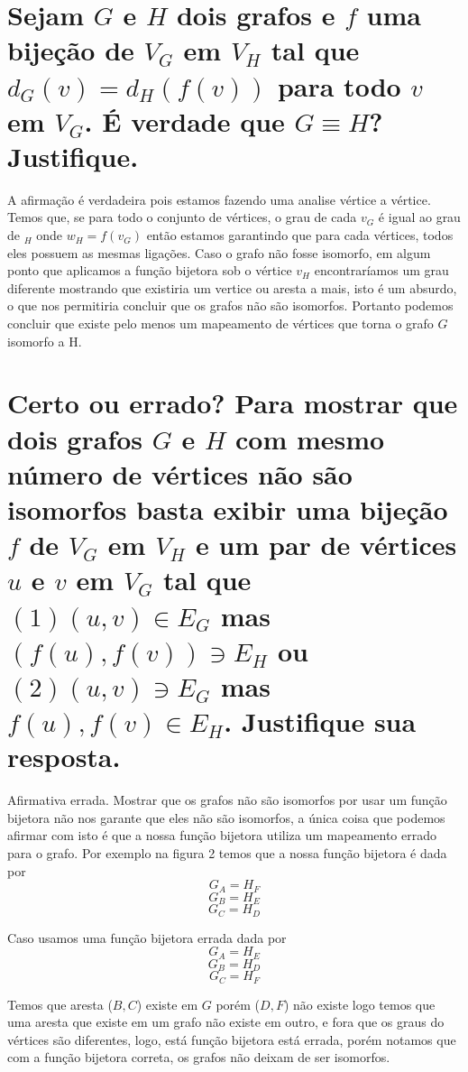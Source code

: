 \documentclass[a4paper,12pt]{article}
\begin{document}
\section{Sejam $G$ e $H$ dois grafos e $f$ uma bijeção de $V_G$ em $V_H$ tal que $d_G (v) = d_H (f (v))$ para todo $v$ em $V_G$. É verdade que $G \equiv H$? Justifique.}
	
	A afirmação é verdadeira pois estamos fazendo uma analise vértice a vértice. Temos que, se para todo o conjunto de vértices, o grau de cada $v_G$ é igual ao grau de $_H$ onde $w_H = f(v_G)$ então estamos garantindo que para cada vértices, todos eles possuem as mesmas ligações. Caso o grafo não fosse isomorfo, em algum ponto que aplicamos a função bijetora sob o vértice $v_H$ encontraríamos um grau diferente mostrando que existiria um vertice ou aresta a mais, isto é um absurdo, o que nos permitiria concluir que os grafos não são isomorfos. Portanto podemos concluir que existe pelo menos um mapeamento de vértices que torna o grafo $G$ isomorfo a H.

\section{Certo ou errado? Para mostrar que dois grafos $G$ e $H$ com mesmo número de vértices não são isomorfos basta exibir uma bijeção $f$ de $V_G$ em $V_H$ e um par de vértices $u$ e $v$ em $V_G$ tal que $(1)(u, v) \in E_G$ mas $(f(u), f(v)) \ni E_H$ ou $(2) (u, v) \ni E_G$ mas $f (u), f (v) \in E_H$. Justifique sua resposta.}
	
	Afirmativa errada. Mostrar que os grafos não são isomorfos por usar um função bijetora não nos garante que eles não são isomorfos, a única coisa que podemos afirmar com isto é que a nossa função bijetora utiliza um mapeamento errado para o grafo. Por exemplo na figura 2 temos que a nossa função bijetora é dada por
	$$G_A = H_F$$
	$$G_B = H_E$$
	$$G_C = H_D$$
	
	Caso usamos uma função bijetora errada dada por
	$$G_A = H_E$$
	$$G_B = H_D$$
	$$G_C = H_F$$
	
	Temos que aresta ($B, C$) existe em $G$ porém ($D, F$) não existe logo temos que uma aresta que existe em um grafo não existe em outro, e fora que os graus do vértices são diferentes, logo, está função bijetora está errada, porém notamos que com a função bijetora correta, os grafos não deixam de ser isomorfos.
\end{document}
